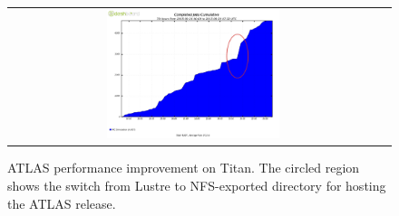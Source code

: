 \begin{figure}[!htb]
    \centering
    \begin{tabular}{cc}
        {\includegraphics[width=0.48\textwidth]{figures/panda-completed-jobs-sw-move.pdf}}\\
    \end{tabular}
    \caption{ATLAS performance improvement on Titan. The circled region shows the switch from Lustre to NFS-exported directory for hosting the ATLAS release.}
    \label{fig:atlas-perf-improvement}
\end{figure}




